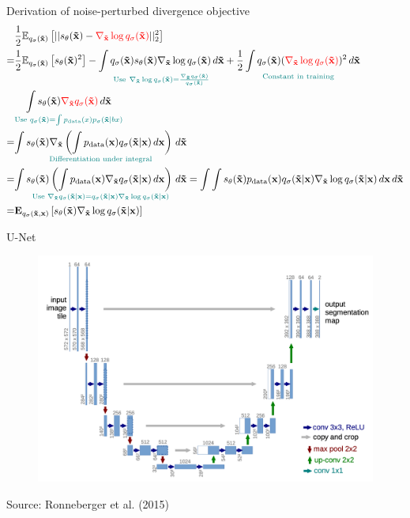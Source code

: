 \documentclass[handout, aspectratio=169,xcolor=dvipsnames]{beamer}
\newcommand{\bx}{\mathbf{x}}
\newcommand{\btx}{\mathbf{\tilde{x}}}
\newcommand{\nbtx}{\nabla_{\btx}}
\begin{document}
\begin{frame}{Derivation of noise-perturbed divergence objective}
  \small
  \begin{align*}
    &\frac{1}{2} \mathbb{E}_{q_\sigma(\btx)} \left[ || s_\theta(\btx) - \textcolor{red}{\nbtx \log q_\sigma (\btx)} ||_2^2 \right]\\
    =&\frac{1}{2} \mathbb{E}_{q_\sigma(\btx)} \left[ s_\theta(\btx)^2 \right] - \underset{\textcolor{teal}{\text{Use}~\nbtx \log q_\sigma (\btx) = \frac{\nbtx q_\sigma(\btx)}{q_\sigma(\btx)} }}{ \int q_{\sigma}(\btx) s_\theta(\btx) \nbtx \log q_\sigma(\btx)  \,d \btx} + \underset{\textcolor{teal}{\text{Constant in training}}}{\frac{1}{2} \int q_\sigma (\btx) (\textcolor{red}{\nbtx \log q_\sigma(\btx)})^2 \,d\btx}\\
    &\underset{\textcolor{teal}{\text{Use } q_\sigma(\btx) = \int p_\text{data}(x) p_\sigma(\btx | bx)} }{ \int s_\theta(\btx) \textcolor{red}{\nbtx q_\sigma(\btx)}  \,d \btx}\\
    = &\underset{\text{\textcolor{teal}{Differentiation under integral}}}{\int s_\theta(\btx) \nbtx \left( \int p_\text{data} (\bx) q_\sigma(\btx | \bx) \,d \bx \right) \, d \btx}  \\
    =& \underset{\textcolor{teal}{\text{Use } \nbtx q_\sigma(\btx | \bx) = q_\sigma (\btx | \bx) \nbtx \log q_\sigma(\btx | \bx)}}{\int s_\theta(\btx) \left( \int p_\text{data}(\bx) \nbtx q_\sigma(\btx | \bx) \,d \bx \right) \,d \btx } = \int \int s_\theta(\btx)  p_\text{data}(\bx) q_\sigma (\btx | \bx) \nbtx \log q_\sigma(\btx | \bx) \,d \bx \,d \btx \\
    =& \mathbf{E}_{q_\sigma(\btx, \bx)} \left[ s_\theta(\btx) \nbtx \log q_\sigma(\btx | \bx) \right]
  \end{align*}
\end{frame}



\begin{frame}{U-Net}
  \centering
  \begin{figure}
    \includegraphics[height=0.65\textheight]{figs/unet-Ronneberger2015.png}
  \end{figure}
  \tiny{
        Source: Ronneberger et al. (2015)
  }
\end{frame}
\end{document}
